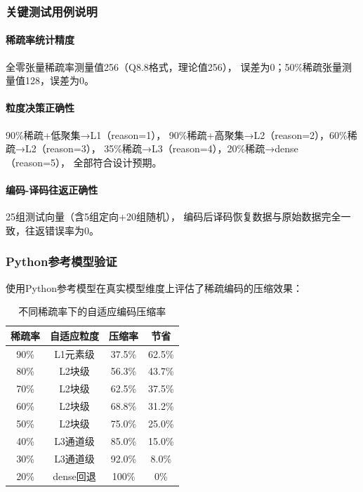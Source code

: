 \documentclass[a4paper,12pt,fontset=ubuntu]{ctexart}
\begin{document}
\subsubsection{关键测试用例说明}

\paragraph{稀疏率统计精度}全零张量稀疏率测量值256（Q8.8格式，理论值256），
误差为0；50\%稀疏张量测量值128，误差为0。

\paragraph{粒度决策正确性}90\%稀疏+低聚集→L1（reason=1），
90\%稀疏+高聚集→L2（reason=2），60\%稀疏→L2（reason=3），
35\%稀疏→L3（reason=4），20\%稀疏→dense（reason=5），
全部符合设计预期。

\paragraph{编码-译码往返正确性}25组测试向量（含5组定向+20组随机），
编码后译码恢复数据与原始数据完全一致，往返错误率为0。

\subsubsection{Python参考模型验证}

使用Python参考模型在真实模型维度上评估了稀疏编码的压缩效果：

\begin{table}[htbp]
\centering
\caption{不同稀疏率下的自适应编码压缩率}
\begin{tabular}{cccc}
\toprule
\textbf{稀疏率} & \textbf{自适应粒度} & \textbf{压缩率} & \textbf{节省} \\
\midrule
90\% & L1元素级 & 37.5\% & 62.5\% \\
80\% & L2块级 & 56.3\% & 43.7\% \\
70\% & L2块级 & 62.5\% & 37.5\% \\
60\% & L2块级 & 68.8\% & 31.2\% \\
50\% & L2块级 & 75.0\% & 25.0\% \\
40\% & L3通道级 & 85.0\% & 15.0\% \\
30\% & L3通道级 & 92.0\% & 8.0\% \\
20\% & dense回退 & 100\% & 0\% \\
\bottomrule
\end{tabular}
\end{table}
\end{document}

